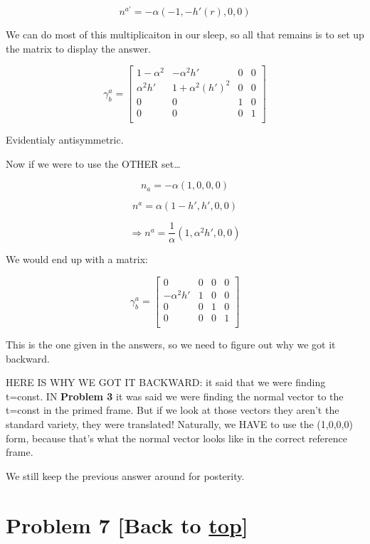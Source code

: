 \documentclass[landscape,letterpaper,10pt,english]{article}
\begin{document}
\[ n^{a'} = -\alpha(-1,-h'(r),0,0)\]

    We can do most of this multiplicaiton in our sleep, so all that remains
is to set up the matrix to display the answer.

\[ \gamma^a_b = \begin{bmatrix}
1-\alpha^2 & -\alpha^2h' & 0 & 0 \\
\alpha^2h' & 1+\alpha^2(h')^2& 0 & 0 \\
0 & 0 & 1 & 0 \\
0 & 0 & 0 & 1 \\
\end{bmatrix}\]

Evidentialy antisymmetric.

Now if we were to use the OTHER set\ldots{}

\[ n_a = -\alpha(1,0,0,0) \]

\[ n^a = \alpha(1-h', h',0,0) \]

\[ \Rightarrow n^a = \frac1\alpha(1, \alpha^2h',0,0) \]

    We would end up with a matrix:

\[ \gamma^a_b = \begin{bmatrix}
0 & 0 & 0 & 0 \\
-\alpha^2h' & 1 & 0 & 0 \\
0 & 0 & 1 & 0 \\
0 & 0 & 0 & 1 \\
\end{bmatrix}\]

This is the one given in the answers, so we need to figure out why we
got it backward.

HERE IS WHY WE GOT IT BACKWARD: it said that we were finding t=const. IN
\textbf{Problem 3} it was said we were finding the normal vector to the
t=const in the primed frame. But if we look at those vectors they aren't
the standard variety, they were translated! Naturally, we HAVE to use
the (1,0,0,0) form, because that's what the normal vector looks like in
the correct reference frame.

We still keep the previous answer around for posterity.

    \hypertarget{problem-7-back-to-top}{%
\section{\texorpdfstring{Problem 7 {[}Back to
\hyperref[toc]{top}{]}}{Problem 7 {[}Back to {]}}}\label{problem-7-back-to-top}}

\[\label{P7}\]
\end{document}
